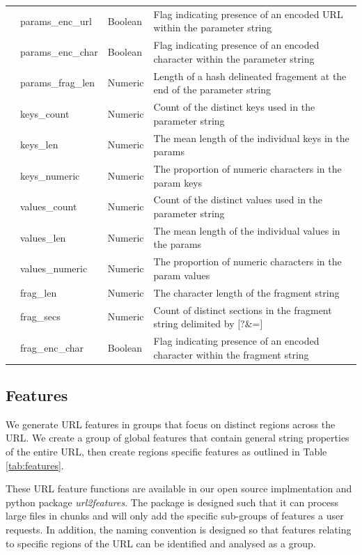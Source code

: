 \documentclass[sigconf]{acmart}
\begin{document}
\begin{table}
\begin{tabular}{|l|l|l|l|}
              &params\_enc\_url       &Boolean     &Flag indicating presence of an encoded URL within the parameter string   \\
              &params\_enc\_char      &Boolean     &Flag indicating presence of an encoded character within the parameter string   \\
              &params\_frag\_len      &Numeric     &Length of a hash delineated fragement at the end of the parameter string   \\
              &keys\_count            &Numeric     &Count of the distinct keys used in the parameter string  \\
              &keys\_len              &Numeric     &The mean length of the individual keys in the params  \\
              &keys\_numeric          &Numeric     &The proportion of numeric characters in the param keys \\
              &values\_count          &Numeric     &Count of the distinct values used in the parameter string  \\
              &values\_len            &Numeric     &The mean length of the individual values in the params  \\
              &values\_numeric        &Numeric     &The proportion of numeric characters in the param values \\
              &frag\_len              &Numeric     &The character length of the fragment string    \\
              &frag\_secs             &Numeric     &Count of distinct sections in the fragment string delimited by [?\&=]  \\
              &frag\_enc\_char        &Boolean     &Flag indicating presence of an encoded character within the fragment string    \\
\bottomrule
\end{tabular}
\end{table}

\subsection{Features}

We generate URL features in groups that focus on distinct regions across the URL. We create a group
of global features that contain general string properties of the entire URL, then create regions
specific features as outlined in Table \ref{tab:features}.

These URL feature functions are available in our open source implmentation and python package \emph{url2features}. 
The package is designed such that it can process large files in chunks and will only add the specific sub-groups of
features a user requests. In addition, the naming convention is designed so that features relating to specific
regions of the URL can be identified and analysed as a group.
\end{document}
